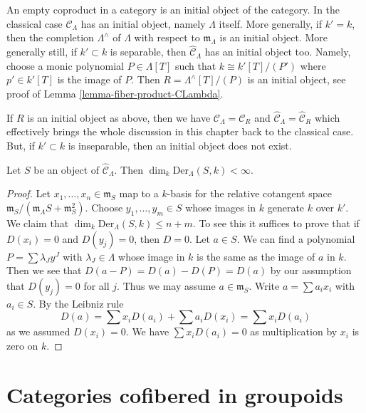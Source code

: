 \noindent
An empty coproduct in a category is an initial object of the category.
In the classical case $\widehat{\mathcal{C}}_\Lambda$ has an initial
object, namely $\Lambda$ itself. More generally, if $k' = k$, then
the completion $\Lambda^\wedge$ of $\Lambda$ with respect to
$\mathfrak m_\Lambda$ is an initial object. More generally still, if
$k' \subset k$ is separable, then $\widehat{\mathcal{C}}_\Lambda$ has an
initial object too. Namely, choose a monic polynomial $P \in \Lambda[T]$
such that $k \cong k'[T]/(P')$ where $p' \in k'[T]$ is the image
of $P$. Then $R = \Lambda^\wedge[T]/(P)$ is an initial object, see proof of
Lemma \ref{lemma-fiber-product-CLambda}.

\medskip\noindent
If $R$ is an initial object as above, then we have
$\mathcal{C}_\Lambda = \mathcal{C}_R$ and
$\widehat{\mathcal{C}}_\Lambda = \widehat{\mathcal{C}}_R$ which effectively
brings the whole discussion in this chapter back to the classical case.
But, if $k' \subset k$ is inseparable, then an initial object does not
exist.

\begin{lemma}
\label{lemma-derivations-finite}
Let $S$ be an object of $\widehat{\mathcal{C}}_\Lambda$.
Then $\dim_k \text{Der}_\Lambda(S, k) < \infty$.
\end{lemma}

\begin{proof}
Let $x_1, \ldots, x_n \in \mathfrak m_S$ map to a $k$-basis
for the relative cotangent space
$\mathfrak m_S/(\mathfrak m_\Lambda S + \mathfrak m_S^2)$.
Choose $y_1, \ldots, y_m \in S$ whose images in $k$ generate $k$
over $k'$. We claim that $\dim_k \text{Der}_\Lambda(S, k) \leq n + m$.
To see this it suffices to prove that if $D(x_i) = 0$ and
$D(y_j) = 0$, then $D = 0$. Let $a \in S$. We can find a
polynomial $P = \sum \lambda_J y^J$ with $\lambda_J \in \Lambda$
whose image in $k$ is the same as the image of $a$ in $k$.
Then we see that $D(a - P) = D(a) - D(P) = D(a)$ by our assumption
that $D(y_j) = 0$ for all $j$. Thus we may assume $a \in \mathfrak m_S$.
Write $a = \sum a_i x_i$ with $a_i \in S$. By the Leibniz rule
$$
D(a) = \sum x_iD(a_i) + \sum a_iD(x_i) = \sum x_iD(a_i)
$$
as we assumed $D(x_i) = 0$. We have $\sum x_iD(a_i) = 0$
as multiplication by $x_i$ is zero on $k$.
\end{proof}




\section{Categories cofibered in groupoids}
\label{section-preliminary}

